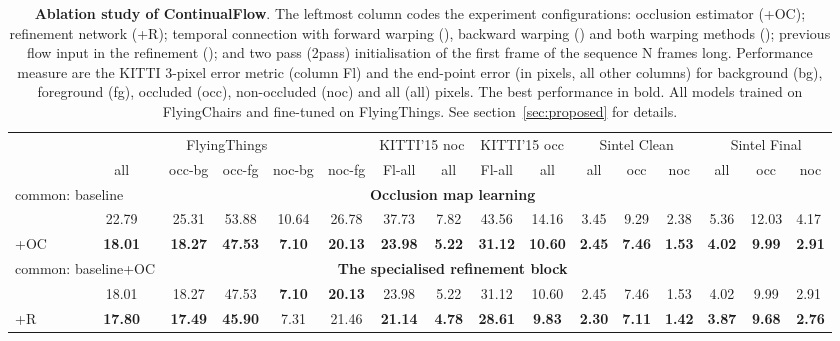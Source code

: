\documentclass[runningheads]{llncs}
\begin{document}
\begin{table}[]
\caption{\textbf{Ablation study of ContinualFlow}.
The leftmost column codes the experiment configurations: occlusion estimator (+OC); refinement network (+R); temporal connection with forward warping (), backward warping () and both warping methods (); previous flow input in the refinement (); and two pass (2pass) initialisation of the first frame of the sequence N frames long. Performance measure are the KITTI 3-pixel error metric (column Fl) and the end-point error (in pixels, all other columns) for background (bg), foreground (fg), occluded (occ), non-occluded (noc) and all (all) pixels.
The best performance in bold.
All models trained on FlyingChairs and fine-tuned on FlyingThings.
See section~\ref{sec:proposed} for details.\\}
\label{tab:ablation_study}
\centering
\begin{adjustbox}{max width=\textwidth}
\begin{tabular}{l|ccccc|cc|cc|ccc|ccc}
\textbf{} & \multicolumn{5}{c|}{FlyingThings} & \multicolumn{2}{c|}{KITTI'15 noc} & \multicolumn{2}{c|}{KITTI'15 occ} & \multicolumn{3}{c|}{Sintel Clean} & \multicolumn{3}{c}{Sintel Final} \\
 & all & occ-bg & occ-fg & noc-bg & noc-fg & Fl-all & all & Fl-all & all & all & occ & noc & all & occ & noc  \\ \hline
\multicolumn{2}{|l}{common: baseline} & \multicolumn{12}{c}{\textbf{Occlusion map learning}} & \multicolumn{2}{l|}{} \\ \hline
\multicolumn{1}{|l|}{} & 22.79 & 25.31 & 53.88 & 10.64 & 26.78 & 37.73 & 7.82 & 43.56 & 14.16 & 3.45 & 9.29 & 2.38 & 5.36 & 12.03 & \multicolumn{1}{|l|}{4.17} \\
\multicolumn{1}{|l|}{+OC} & \textbf{18.01} & \textbf{18.27} & \textbf{47.53} & \textbf{7.10} & \textbf{20.13} & \textbf{23.98} & \textbf{5.22} & \textbf{31.12} & \textbf{10.60} & \textbf{2.45} & \textbf{7.46} & \textbf{1.53} & \textbf{4.02} & \textbf{9.99} & \multicolumn{1}{|l|}{\textbf{2.91}} \\ \hline \hline
\multicolumn{2}{|l}{common: baseline+OC} & \multicolumn{12}{c}{\textbf{The specialised refinement block}} & \multicolumn{2}{l|}{} \\ \hline
\multicolumn{1}{|l|}{} & 18.01 & 18.27 & 47.53 & \textbf{7.10} & \textbf{20.13} & 23.98 & 5.22 & 31.12 & 10.60 & 2.45 & 7.46 & 1.53 & 4.02 & 9.99 & \multicolumn{1}{|l|}{2.91} \\
\multicolumn{1}{|l|}{+R} & \textbf{17.80} & \textbf{17.49} & \textbf{45.90} & 7.31 & 21.46 & \textbf{21.14} & \textbf{4.78} & \textbf{28.61} & \textbf{9.83} & \textbf{2.30} & \textbf{7.11} & \textbf{1.42} & \textbf{3.87} & \textbf{9.68} & \multicolumn{1}{|l|}{\textbf{2.76}} \\ \hline \hline

\end{tabular}
\end{adjustbox}
\end{table}
\end{document}
